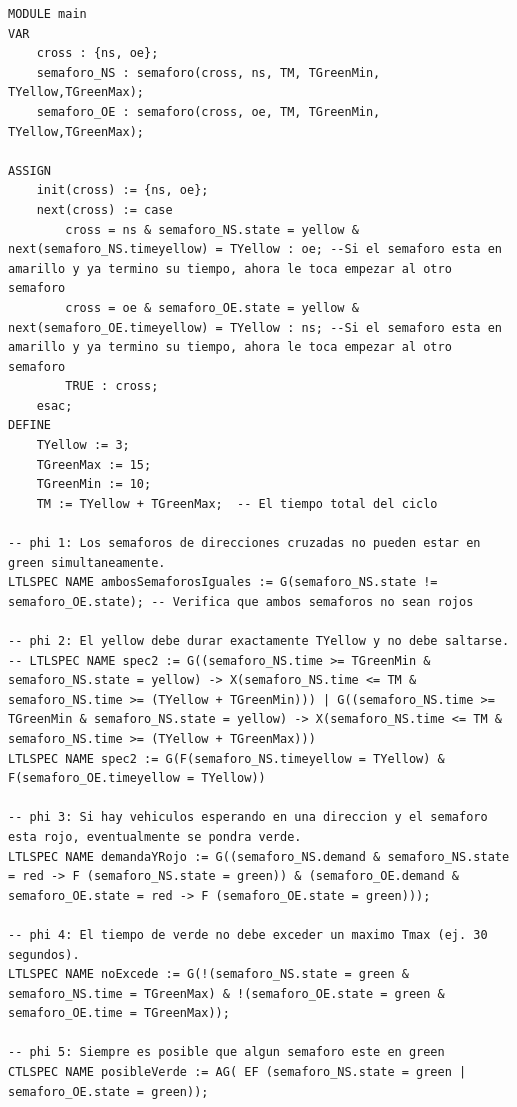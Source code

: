 \begin{lstlisting}[language=NuSMV, caption={Modelo con demanda y extensión inteligente}]
MODULE main
VAR
    cross : {ns, oe};
    semaforo_NS : semaforo(cross, ns, TM, TGreenMin, TYellow,TGreenMax);
    semaforo_OE : semaforo(cross, oe, TM, TGreenMin, TYellow,TGreenMax);
    
ASSIGN
    init(cross) := {ns, oe};
    next(cross) := case
        cross = ns & semaforo_NS.state = yellow & next(semaforo_NS.timeyellow) = TYellow : oe; --Si el semaforo esta en amarillo y ya termino su tiempo, ahora le toca empezar al otro semaforo
        cross = oe & semaforo_OE.state = yellow & next(semaforo_OE.timeyellow) = TYellow : ns; --Si el semaforo esta en amarillo y ya termino su tiempo, ahora le toca empezar al otro semaforo
        TRUE : cross;
    esac;
DEFINE
    TYellow := 3; 
    TGreenMax := 15;
    TGreenMin := 10;
    TM := TYellow + TGreenMax;  -- El tiempo total del ciclo

-- phi 1: Los semaforos de direcciones cruzadas no pueden estar en green simultaneamente.
LTLSPEC NAME ambosSemaforosIguales := G(semaforo_NS.state != semaforo_OE.state); -- Verifica que ambos semaforos no sean rojos

-- phi 2: El yellow debe durar exactamente TYellow y no debe saltarse.
-- LTLSPEC NAME spec2 := G((semaforo_NS.time >= TGreenMin & semaforo_NS.state = yellow) -> X(semaforo_NS.time <= TM & semaforo_NS.time >= (TYellow + TGreenMin))) | G((semaforo_NS.time >= TGreenMin & semaforo_NS.state = yellow) -> X(semaforo_NS.time <= TM & semaforo_NS.time >= (TYellow + TGreenMax)))
LTLSPEC NAME spec2 := G(F(semaforo_NS.timeyellow = TYellow) & F(semaforo_OE.timeyellow = TYellow))

-- phi 3: Si hay vehiculos esperando en una direccion y el semaforo esta rojo, eventualmente se pondra verde.
LTLSPEC NAME demandaYRojo := G((semaforo_NS.demand & semaforo_NS.state = red -> F (semaforo_NS.state = green)) & (semaforo_OE.demand & semaforo_OE.state = red -> F (semaforo_OE.state = green)));

-- phi 4: El tiempo de verde no debe exceder un maximo Tmax (ej. 30 segundos).
LTLSPEC NAME noExcede := G(!(semaforo_NS.state = green &  semaforo_NS.time = TGreenMax) & !(semaforo_OE.state = green &  semaforo_OE.time = TGreenMax)); 

-- phi 5: Siempre es posible que algun semaforo este en green
CTLSPEC NAME posibleVerde := AG( EF (semaforo_NS.state = green | semaforo_OE.state = green));
\end{lstlisting}



